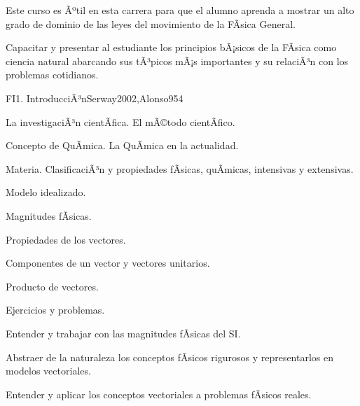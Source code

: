 \begin{syllabus}


\begin{justification}
Este curso es Ãºtil en esta carrera para que el alumno aprenda a mostrar un alto grado de dominio de las leyes del movimiento de la FÃ­sica General.
\end{justification}

\begin{goals}
\item Capacitar y presentar al estudiante los principios bÃ¡sicos de la FÃ­sica como ciencia natural abarcando sus tÃ³picos mÃ¡s importantes y su relaciÃ³n con los problemas cotidianos.
\end{goals}

\begin{outcomes}
\end{outcomes}

\begin{unit}{FI1. IntroducciÃ³n}{Serway2002,Alonso95}{4}
\begin{topics}
      \item La investigaciÃ³n cientÃ­fica. El mÃ©todo cientÃ­fico.
      \item Concepto de QuÃ­mica. La QuÃ­mica en la actualidad.
      \item Materia. ClasificaciÃ³n y propiedades fÃ­sicas, quÃ­micas, intensivas y extensivas.
      \item Modelo idealizado.
      \item Magnitudes fÃ­sicas.
      \item Propiedades de los vectores.
      \item Componentes de un vector y vectores unitarios.
      \item Producto de vectores.
      \item Ejercicios y problemas.
   \end{topics}

   \begin{unitgoals}
      \item Entender y trabajar con las magnitudes fÃ­sicas del SI.
      \item Abstraer de la naturaleza los conceptos fÃ­sicos rigurosos y
      representarlos en modelos vectoriales.
      \item Entender y aplicar los conceptos vectoriales a problemas fÃ­sicos reales.
   \end{unitgoals}
\end{unit}


\end{syllabus}
